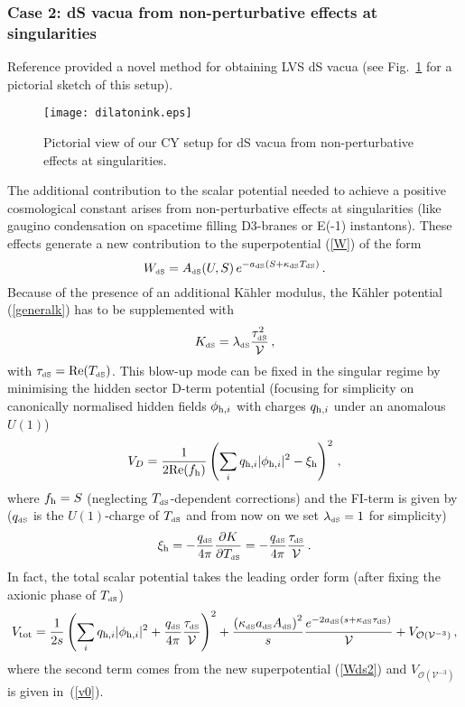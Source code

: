 \documentclass[11pt,a4paper]{article}
\newcommand{\be}{\begin{equation}}
\newcommand{\ee}{\end{equation}}
\def\dS{{\scriptscriptstyle \rm dS}}
\newcommand\vo{{\mathcal{V}}}
\newcommand{\mc}{\mathcal}
\begin{document}
\subsubsection{Case 2: dS vacua from non-perturbative effects at singularities}
\label{dilatonuplift}

Reference \cite{Cicoli:2012fh} provided a novel method for obtaining LVS dS vacua
(see Fig.~\ref{Fig2} for a pictorial sketch of this setup).
\begin{figure}[t]
\begin{center}
\texttt{[image: dilatonink.eps]}
\caption{Pictorial view of our CY setup for dS vacua from non-perturbative effects at singularities.} \label{Fig2}
\end{center}
\end{figure}
The additional contribution to the scalar potential needed to achieve a positive cosmological constant arises
from non-perturbative effects at singularities (like gaugino condensation on spacetime filling D3-branes or E(-1) instantons).
These effects generate a new contribution to the superpotential (\ref{W}) of the form
\be
W_\dS = A_\dS(U, S) \,e^{-a_\dS (S + \kappa_\dS T_\dS)}\,.
\label{Wds2}
\ee
Because of the presence of an additional K\"ahler modulus, the K\"ahler potential (\ref{generalk}) has to be supplemented with
\be
\label{dk2}
K_\dS =  \lambda_\dS\frac{\tau_\dS^2}{\vo}\,,
\ee
with $\tau_\dS={\rm Re}(T_\dS)$. This blow-up mode can be fixed in the singular regime by minimising the hidden sector D-term potential
(focusing for simplicity on canonically normalised hidden fields $\phi_{{\rm h},i}$ with charges $q_{{\rm h},i}$ under an anomalous $U(1)$)
\be
\label{DtermPot1}
V_D = \frac{1}{2{\rm Re}(f_{\rm h})} \left(\sum_i q_{{\rm h},i} |\phi_{{\rm h},i}|^2 - \xi_{\rm h}\right)^2\,,
\ee
where $f_{\rm h} = S$ (neglecting $T_\dS$-dependent corrections) and the FI-term is given by
($q_\dS$ is the $U(1)$-charge of $T_\dS$ and from now on we set $\lambda_\dS=1$ for simplicity)
\be
\xi_{\rm h} = - \frac{q_\dS}{4\pi} \frac{\partial K}{\partial T_\dS} = - \frac{q_\dS}{4\pi} \frac{\tau_\dS}{\vo}\,.
\ee
In fact, the total scalar potential takes the leading order form (after fixing the axionic phase of $T_\dS$) \cite{Cicoli:2012fh}
\be
V_{\rm tot} = \frac{1}{2s} \left(\sum_i q_{{\rm h},i} |\phi_{{\rm h},i}|^2 + \frac{q_\dS}{4\pi} \frac{\tau_\dS}{\vo}\right)^2
+ \frac{\left(\kappa_\dS a_\dS A_\dS\right)^2}{s}\frac{e^{-2 a_\dS \left(s+\kappa_\dS\tau_\dS\right)}}{\vo} + V_{\mc{O}(\vo^{-3})}\,,
\label{Vtot1}
\ee
where the second term comes from the new superpotential (\ref{Wds2}) and $V_{\mc{O}(\vo^{-3})}$ is given in~(\ref{v0}).
\end{document}
